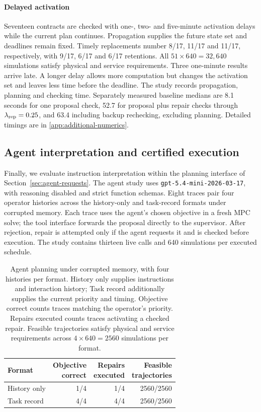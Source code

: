 \documentclass[preprint,12pt]{elsarticle}
\theoremstyle{definition}
\theoremstyle{plain}
\theoremstyle{definition}
\theoremstyle{plain}
\newcommand{\appref}[1]{\ref{#1}}
\begin{document}
\paragraph{Delayed activation}
\label{sec:delayed-handover-results}
Seventeen contracts are checked with one-, two- and five-minute activation
delays while the current plan continues. Propagation supplies the future
state set and deadlines remain fixed. Timely replacements number 8/17,
11/17 and 11/17, respectively, with 9/17, 6/17 and 6/17 retentions.
All $51\times640=32{,}640$ simulations satisfy physical and service
requirements. Three one-minute results arrive late. A longer delay
allows more computation but changes the activation set and leaves less
time before the deadline. The study records propagation, planning and
checking time. Separately measured baseline medians are 8.1 seconds for
one proposal check, 52.7 for proposal plus repair checks through
$\lambda_{\rm rep}=0.25$, and 63.4 including backup rechecking, excluding
planning. Detailed timings are in \appref{app:additional-numerics}.

\subsection{Agent interpretation and certified execution}
\label{sec:task-state-live}
\label{sec:queue-live-pilot}
\label{sec:primary-memory-pressure}
Finally, we evaluate instruction interpretation within the planning interface
of Section~\ref{sec:agent-requests}. The agent study uses
\texttt{gpt-5.4-mini-2026-03-17}, with reasoning
disabled and strict function schemas. Eight traces pair four operator
histories across the history-only and task-record formats under corrupted
memory. Each trace uses the agent's chosen objective in a fresh MPC solve;
the tool interface forwards the proposal directly to the supervisor.
After rejection, repair is attempted only if the agent requests it and
is checked before execution. The study contains thirteen live calls and
640 simulations per executed schedule.

\begin{table}[!htbp]
\centering\small
\caption{Agent planning under corrupted memory, with four histories per
format. History only supplies instructions and interaction history; Task
record additionally supplies the current priority and timing. Objective
correct counts traces matching the operator's priority. Repairs executed
counts traces activating a checked repair. Feasible trajectories satisfy
physical and service requirements across $4\times640=2560$ simulations
per format.}
\label{tab:benchmark-api-execution}
\begin{tabularx}{\linewidth}{@{}Xrrr@{}}
\toprule
Format & \shortstack{Objective\\correct} & \shortstack{Repairs\\executed} & \shortstack{Feasible\\trajectories}\\
\midrule
History only & 1/4 & 1/4 & 2560/2560\\
Task record & 4/4 & 4/4 & 2560/2560\\
\bottomrule
\end{tabularx}
\end{table}
\end{document}
